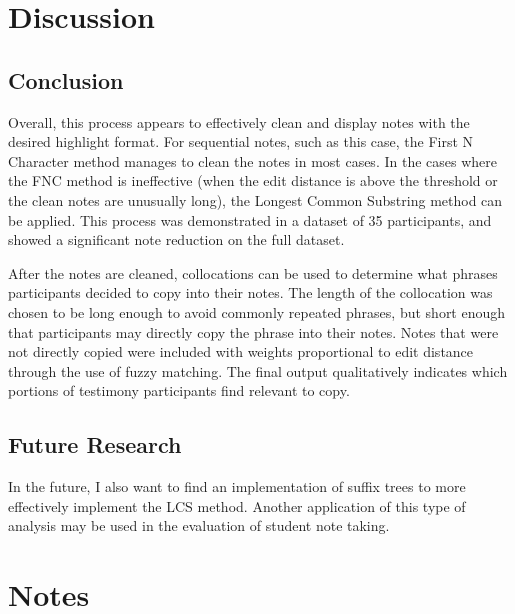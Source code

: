 \documentclass[print]{nuthesis}
\begin{document}
\hypertarget{discussion-1}{%
\section{Discussion}\label{discussion-1}}

\hypertarget{conclusion-1}{%
\subsection{Conclusion}\label{conclusion-1}}

Overall, this process appears to effectively clean and display notes with the desired highlight format.
For sequential notes, such as this case, the First N Character method manages to clean the notes in most cases.
In the cases where the FNC method is ineffective (when the edit distance is above the threshold or the clean notes are unusually long), the Longest Common Substring method can be applied.
This process was demonstrated in a dataset of 35 participants, and showed a significant note reduction on the full dataset.

After the notes are cleaned, collocations can be used to determine what phrases participants decided to copy into their notes.
The length of the collocation was chosen to be long enough to avoid commonly repeated phrases, but short enough that participants may directly copy the phrase into their notes.
Notes that were not directly copied were included with weights proportional to edit distance through the use of fuzzy matching.
The final output qualitatively indicates which portions of testimony participants find relevant to copy.

\hypertarget{future-research-1}{%
\subsection{Future Research}\label{future-research-1}}

In the future, I also want to find an implementation of suffix trees to more effectively implement the LCS method.
Another application of this type of analysis may be used in the evaluation of student note taking.

\hypertarget{notes}{%
\section{Notes}\label{notes}}
\end{document}
